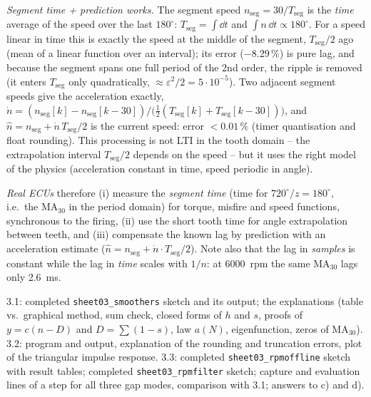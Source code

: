 \begin{solution}
\emph{Segment time + prediction works.} The segment speed
$n_{\text{seg}}=30/T_{\text{seg}}$ is the \emph{time} average of the speed over
the last $180^\circ$: $T_{\text{seg}}=\int\!\dd t$ and $\int n\,\dd t\propto180^\circ$.
For a speed linear in time this is exactly the speed at the middle of the
segment, $T_{\text{seg}}/2$ ago (mean of a linear function over an interval);
its error ($-8.29\,\%$) is pure lag, and because the segment spans one full
period of the 2nd order, the ripple is removed (it enters $T_{\text{seg}}$ only
quadratically, $\approx\varepsilon^2/2=5\cdot10^{-5}$). Two adjacent segment
speeds give the acceleration exactly, $\dot n=(n_{\text{seg}}[k]-n_{\text{seg}}[k-30])/
\bigl(\tfrac12(T_{\text{seg}}[k]+T_{\text{seg}}[k-30])\bigr)$, and
$\hat n=n_{\text{seg}}+\dot n\,T_{\text{seg}}/2$ is the current speed: error
$<0.01\,\%$ (timer quantisation and float rounding). This processing is not LTI
in the tooth domain -- the extrapolation interval $T_{\text{seg}}/2$ depends on
the speed -- but it uses the right model of the physics (acceleration constant in
time, speed periodic in angle).

\emph{Real ECUs} therefore (i) measure the \emph{segment time} (time for
$720^\circ/z=180^\circ$, i.e.\ the MA$_{30}$ in the period domain) for
torque, misfire and speed functions, synchronous to the firing, (ii) use the
short tooth time for angle extrapolation between teeth, and (iii) compensate
the known lag by prediction with an acceleration estimate ($\hat n=n_{\text{seg}}
+\dot n\cdot T_{\text{seg}}/2$). Note also that the lag in \emph{samples} is
constant while the lag in \emph{time} scales with $1/n$: at \SI{6000}{rpm} the
same MA$_{30}$ lags only \SI{2.6}{ms}.
\end{solution}

\begin{deliverables}
3.1: completed \texttt{sheet03\_smoothers} sketch and its output; the
explanations (table vs.\ graphical method, sum check, closed forms of $h$ and $s$,
proofs of $y=c(n-D)$ and $D=\sum(1-s)$, law $a(N)$, eigenfunction, zeros of
MA$_{30}$). 3.2: program and output, explanation of the rounding and truncation
errors, plot of the triangular impulse response. 3.3: completed
\texttt{sheet03\_rpmoffline} sketch with result tables; completed
\texttt{sheet03\_rpmfilter} sketch; capture and evaluation lines of a step for
all three gap modes, comparison with 3.1; answers to c) and d).
\end{deliverables}
